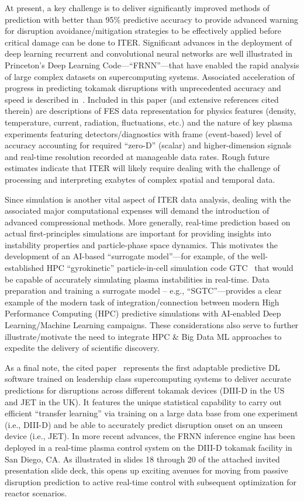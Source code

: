At present, a key challenge is to deliver significantly improved methods of prediction with better than 95\% predictive accuracy to provide advanced warning for disruption avoidance/mitigation strategies to be effectively applied before critical damage can be done to ITER.  Significant advances in the deployment of deep learning recurrent and convolutional neural networks are well illustrated in Princeton’s Deep Learning Code---``FRNN''---that have enabled the rapid analysis of large complex datasets on supercomputing systems.  
Associated acceleration of progress in predicting tokamak disruptions with unprecedented accuracy and speed is described in~\cite{plasmaref}. 
Included in this paper (and extensive references cited therein) are descriptions of FES data representation for physics features (density, temperature, current, radiation, fluctuations, etc.) and the nature of key plasma experiments featuring detectors/diagnostics with frame (event-based) level of accuracy accounting for required ``zero-D'' (scalar) and higher-dimension signals and real-time resolution recorded at manageable data rates. 
Rough future estimates indicate that ITER will likely require dealing with the challenge of processing and interpreting exabytes of complex spatial and temporal data. 

Since simulation is another vital aspect of ITER data analysis, dealing with the associated major computational expenses will demand the introduction of advanced compressional methods.  
More generally, real-time prediction based on actual first-principles simulations are important for providing insights into instability properties and particle-phase space dynamics. This motivates the development of an AI-based ``surrogate model''---for example, of the well-established HPC ``gyrokinetic'' particle-in-cell simulation code GTC~\cite{plasmaref2} that would be capable of accurately simulating plasma instabilities in real-time.  Data preparation and training a surrogate model – e.g., ``SGTC''---provides a clear example of the modern task of integration/connection between modern High Performance Computing (HPC) predictive simulations with AI-enabled Deep Learning/Machine Learning campaigns. 
These considerations also serve to further illustrate/motivate the need to integrate HPC \& Big Data ML approaches to expedite the delivery of scientific discovery.

As a final note, the cited paper~\cite{plasmaref} represents the first adaptable predictive DL software trained on leadership class supercomputing systems to deliver accurate predictions for disruptions across different tokamak devices (DIII-D in the US and JET in the UK).  
It features the unique statistical capability to carry out efficient ``transfer learning'' via training on a large data base from one experiment (i.e., DIII-D) and be able to accurately predict disruption onset on an unseen device (i.e., JET).  In more recent advances, the FRNN inference engine has been deployed in a real-time plasma control system on the DIII-D tokamak facility in San Diego, CA.  
As illustrated in slides 18 through 20 of the attached invited presentation slide deck, this opens up exciting avenues for moving from passive disruption prediction to active real-time control with subsequent optimization for reactor scenarios.  

